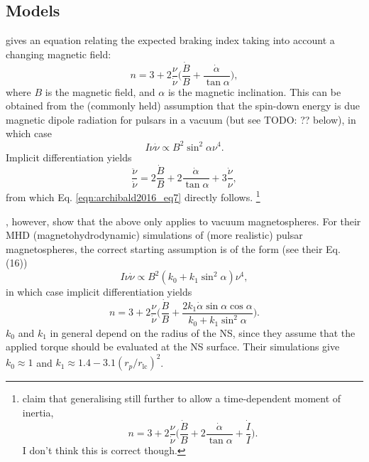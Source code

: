 \documentclass{book}
\newcommand{\todo}[1]{{\color{red}TODO: {#1}}}
\newcommand{\rL}{r_\text{lc}} %
\begin{document}
\subsection{Models}

\citet[][Eq. (7)]{Archibald2016} gives an equation relating the expected braking index taking into account a changing magnetic field:
\begin{equation}
  n = 3 + 2\frac{\nu}{\dot{\nu}} \bigg( \frac{\dot{B}}{B} + \frac{\dot{\alpha}}{\tan\alpha} \bigg),
  \label{eqn:archibald2016_eq7}
\end{equation}
where $B$ is the magnetic field, and $\alpha$ is the magnetic inclination.
This can be obtained from the (commonly held) assumption that the spin-down energy is due magnetic dipole radiation for pulsars in a vacuum (but see \todo{??} below), in which case
\begin{equation}
  I \nu \dot{\nu} \propto B^2 \sin^2\alpha \nu^4.
\end{equation}
Implicit differentiation yields
\begin{equation}
  \frac{\ddot{\nu}}{\dot{\nu}} = 2\frac{\dot{B}}{B} + 2\frac{\dot{\alpha}}{\tan\alpha} + 3\frac{\dot{\nu}}{\nu},
\end{equation}
from which Eq. \eqref{eqn:archibald2016_eq7} directly follows.
\footnote{\citet[cf.][]{Li2024} claim that generalising still further to allow a time-dependent moment of inertia,
\[
  n = 3 + 2\frac{\nu}{\dot{\nu}} \bigg( \frac{\dot{B}}{B} + 2\frac{\dot{\alpha}}{\tan\alpha} + \frac{\dot{I}}{I} \bigg).
\]
I don't think this is correct though.}

\citet{Philippov2014}, however, show that the above only applies to vacuum magnetospheres.
For their MHD (magnetohydrodynamic) simulations of (more realistic) pulsar magnetospheres, the correct starting assumption is of the form (see their Eq. (16))
\begin{equation}
  I \nu \dot{\nu} \propto B^2 (k_0 + k_1 \sin^2 \alpha) \nu^4,
\end{equation}
in which case implicit differentiation yields
\begin{equation}
  n = 3 + 2\frac{\nu}{\dot{\nu}} \bigg( \frac{\dot{B}}{B} + \frac{2 k_1 \dot{\alpha} \sin\alpha \cos\alpha}{k_0 + k_1 \sin^2\alpha} \bigg).
\end{equation}
$k_0$ and $k_1$ in general depend on the radius of the NS, since they assume that the applied torque should be evaluated at the NS surface.
Their simulations give $k_0 \approx 1$ and $k_1 \approx 1.4 - 3.1(r_p/\rL)^2$.
\end{document}
